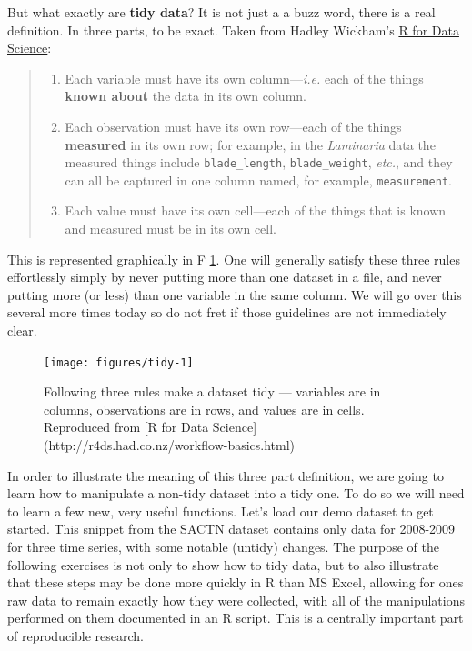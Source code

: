 \documentclass[
]{book}
\providecommand{\tightlist}{%
  \setlength{\itemsep}{0pt}\setlength{\parskip}{0pt}}
\begin{document}
But what exactly are \textbf{tidy data}? It is not just a a buzz word, there is a real definition. In three parts, to be exact. Taken from Hadley Wickham's \href{http://r4ds.had.co.nz/workflow-basics.html}{R for Data Science}:

\begin{quote}
\begin{enumerate}
\def\labelenumi{\arabic{enumi}.}
\tightlist
\item
  Each variable must have its own column---\emph{i.e.} each of the things \textbf{known about} the data in its own column.
\item
  Each observation must have its own row---each of the things \textbf{measured} in its own row; for example, in the \emph{Laminaria} data the measured things include \texttt{blade\_length}, \texttt{blade\_weight}, \emph{etc.}, and they can all be captured in one column named, for example, \texttt{measurement}.\\
\item
  Each value must have its own cell---each of the things that is known and measured must be in its own cell.
\end{enumerate}
\end{quote}

This is represented graphically in F \ref{fig:tidy-structure}. One will generally satisfy these three rules effortlessly simply by never putting more than one dataset in a file, and never putting more (or less) than one variable in the same column. We will go over this several more times today so do not fret if those guidelines are not immediately clear.

\begin{figure}

{\centering \texttt{[image: figures/tidy-1]} 

}

\caption{Following three rules make a dataset tidy --- variables are in columns, observations are in rows, and values are in cells. Reproduced from [R for Data Science](http://r4ds.had.co.nz/workflow-basics.html)}\label{fig:tidy-structure}
\end{figure}

In order to illustrate the meaning of this three part definition, we are going to learn how to manipulate a non-tidy dataset into a tidy one. To do so we will need to learn a few new, very useful functions. Let's load our demo dataset to get started. This snippet from the SACTN dataset contains only data for 2008-2009 for three time series, with some notable (untidy) changes. The purpose of the following exercises is not only to show how to tidy data, but to also illustrate that these steps may be done more quickly in R than MS Excel, allowing for ones raw data to remain exactly how they were collected, with all of the manipulations performed on them documented in an R script. This is a centrally important part of reproducible research.
\end{document}
